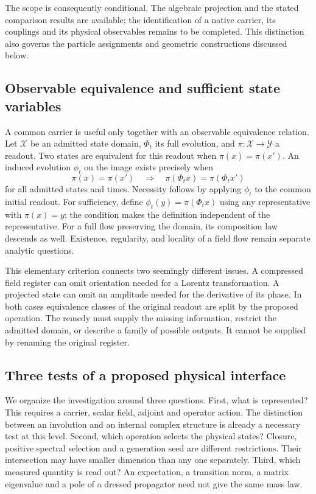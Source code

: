 \documentclass[11pt,a4paper]{article}
\begin{document}
The scope is consequently conditional. The algebraic projection and
the stated comparison results are available; the identification of a
native carrier, its couplings and its physical observables remains to be
completed. This distinction also governs the particle assignments and
geometric constructions discussed below.
\subsection{Observable equivalence and sufficient state variables}

A common carrier is useful only together with an observable equivalence
relation. Let $\mathcal X$ be an admitted state domain, $\Phi_t$ its
full evolution, and $\pi:\mathcal X\to\mathcal Y$ a readout.
Two states are equivalent for this readout when $\pi(x)=\pi(x')$.
An induced evolution $\phi_t$ on the image exists precisely when
\begin{equation}
 \pi(x)=\pi(x')\quad\Longrightarrow\quad
 \pi(\Phi_t x)=\pi(\Phi_t x')
\end{equation}
for all admitted states and times. Necessity follows by applying
$\phi_t$ to the common initial readout. For sufficiency, define
$\phi_t(y)=\pi(\Phi_t x)$ using any representative with $\pi(x)=y$;
the condition makes the definition independent of the representative.
For a full flow preserving the domain, its composition law descends
as well. Existence, regularity, and locality of a field flow remain
separate analytic questions.

This elementary criterion connects two seemingly different issues.
A compressed field register can omit orientation needed for a Lorentz
transformation. A projected state can omit an amplitude needed for
the derivative of its phase. In both cases equivalence classes of
the original readout are split by the proposed operation. The remedy
must supply the missing information, restrict the admitted domain,
or describe a family of possible outputs. It cannot be supplied by
renaming the original register.

\subsection{Three tests of a proposed physical interface}

We organize the investigation around three questions. First, what
is represented? This requires a carrier, scalar field, adjoint and
operator action. The distinction between an involution and an internal
complex structure is already a necessary test at this level. Second,
which operation selects the physical states? Closure, positive
spectral selection and a generation seed are different restrictions.
Their intersection may have smaller dimension than any one separately.
Third, which measured quantity is read out? An expectation, a transition
norm, a matrix eigenvalue and a pole of a dressed propagator need not
give the same mass law.
\end{document}

